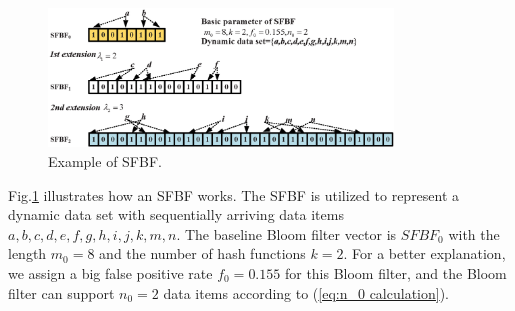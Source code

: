 \documentclass[10pt,journal,letterpaper]{IEEEtran}
\begin{document}
\begin{figure}[!h]
\centering
\includegraphics[width=3.6in]{fig/SFBFexample}
\caption{Example of SFBF.}
\label{fig:Example of SFBF.}
\end{figure}

Fig.\ref{fig:Example of SFBF.} illustrates how an SFBF works. The SFBF is utilized to represent a dynamic data set with sequentially arriving data items  $a, b, c, d, e, f, g, h, i, j, k, m, n$. The baseline Bloom filter vector is $SFBF_0$ with  the length $m_0=8$ and the number of hash functions $k=2$. For a better explanation, we assign a big false positive rate $f_0=0.155$ for this Bloom filter, and the Bloom filter can support $n_0=2$ data items according to (\ref{eq:n_0 calculation}).
\end{document}

